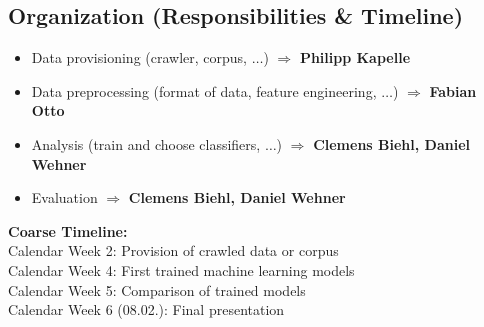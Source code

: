 \documentclass{scrartcl}
\begin{document}
\vspace*{-3mm}
\subsection{Organization (Responsibilities \& Timeline)}
\vspace*{-3mm}

\begin{itemize}
\item Data provisioning (crawler, corpus,  $\dots$)
	$\Rightarrow$ \textbf{Philipp Kapelle}
\item Data preprocessing (format of data, feature engineering, $\dots$) 
	$\Rightarrow$ \textbf{Fabian Otto}
\item Analysis (train and choose classifiers, $\dots$)
	$\Rightarrow$ \textbf{Clemens Biehl, Daniel Wehner}
\item Evaluation
	$\Rightarrow$ \textbf{Clemens Biehl, Daniel Wehner}
\end{itemize}

\vspace*{-2mm}
\textbf{Coarse Timeline:} \\
Calendar Week 2: Provision of crawled data or corpus \\
Calendar Week 4: First trained machine learning models \\
Calendar Week 5: Comparison of trained models \\
Calendar Week 6 (08.02.): Final presentation
\end{document}
